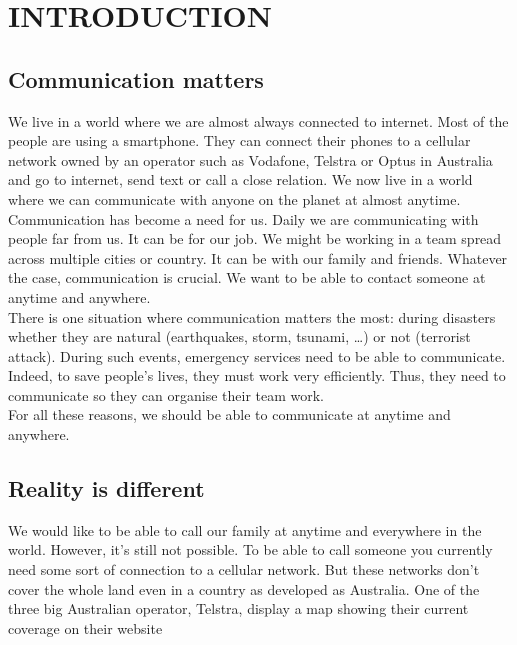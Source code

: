 \chapter{INTRODUCTION}




\section{Communication matters}

We live in a world where we are almost always connected to internet. Most of the people are using a smartphone. They can connect their phones to a cellular network owned by an operator such as Vodafone, Telstra or Optus in Australia and go to internet, send text or call a close relation. We now live in a world where we can communicate with anyone on the planet at almost anytime.\\
Communication has become a need for us. Daily we are communicating with people far from us. It can be for our job. We might be working in a team spread across multiple cities or country. It can be with our family and friends. Whatever the case, communication is crucial. We want to be able to contact someone at anytime and anywhere.\\
There is one situation where communication matters the most: during disasters whether they are natural (earthquakes, storm, tsunami, …) or not (terrorist attack). During such events, emergency services need to be able to communicate. Indeed, to save people’s lives, they must work very efficiently. Thus, they need to communicate so they can organise their team work.\\
For all these reasons, we should be able to communicate at anytime and anywhere.






\section{Reality is different}

We would like to be able to call our family at anytime and everywhere in the world. However, it’s still not possible. To be able to call someone you currently need some sort of connection to a cellular network. But these networks don’t cover the whole land even in a country as developed as Australia. One of the three big Australian operator, Telstra, display a map showing their current coverage on their website

